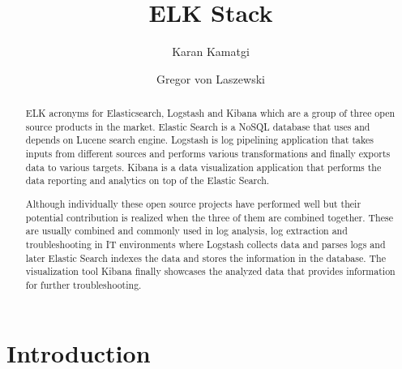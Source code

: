 

\title{ELK Stack}


\author{Karan Kamatgi}


\author{Gregor von Laszewski}


\renewcommand{\shortauthors}{G. v. Laszewski}


\begin{abstract}

ELK acronyms for Elasticsearch, Logstash and Kibana which are a group of three 
open source products in the market. Elastic Search is a NoSQL database that 
uses and depends on Lucene search engine. Logstash is log pipelining application
 that takes inputs from different sources and performs various transformations 
 and finally exports data to various targets. Kibana is a data visualization 
 application that performs the data reporting and analytics on top of the 
 Elastic Search.

Although individually these open source projects have performed well but their 
potential contribution is realized when the three of them are combined together.
 These are usually combined and commonly used in log analysis, log extraction 
 and troubleshooting in IT environments where Logstash collects data and parses 
 logs and later Elastic Search indexes the data and stores the information in 
 the database. The visualization tool Kibana finally showcases the analyzed 
 data that provides information for further troubleshooting.

\end{abstract}



\maketitle


\section{Introduction}


